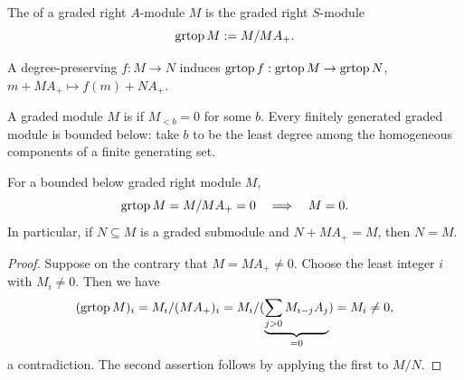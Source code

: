 \begin{definition}\label{not:graded-top}
The  of a graded right $A$-module $M$ is the graded right $S$-module
\[
\operatorname{grtop}\nolimits M:=M/MA_+.
\]
\end{definition}

A degree-preserving $f:M\to N$ induces $\operatorname{grtop}\nolimits f:\operatorname{grtop}\nolimits M\to\operatorname{grtop}\nolimits N$, $m+MA_+\mapsto f(m)+NA_+$.

A graded module $M$ is  if $M_{<b}=0$ for some $b$.
Every finitely generated graded module is bounded below: take $b$ to be the least degree among the homogeneous components of a finite generating set.

\begin{lemma}\label{lem:graded-nakayama}
For a bounded below graded right module $M$,
\[
\operatorname{grtop}\nolimits M=M/MA_+=0\quad\Longrightarrow\quad M=0.
\]
In particular, if $N\subseteq M$ is a graded submodule and $N+MA_+=M$, then $N=M$.
\end{lemma}

\begin{proof}
Suppose on the contrary that $M=MA_+\neq0$.  Choose the least integer $i$ with $M_i\neq0$.  Then we have
\[(\operatorname{grtop}\nolimits M)_i = M_i/(MA_+)_i = M_i/(\underbrace{\sum_{j>0} M_{i-j}A_j}_{=0}) = M_i\neq 0,\]
 a contradiction.
The second assertion follows by applying the first to $M/N$.
\end{proof}

